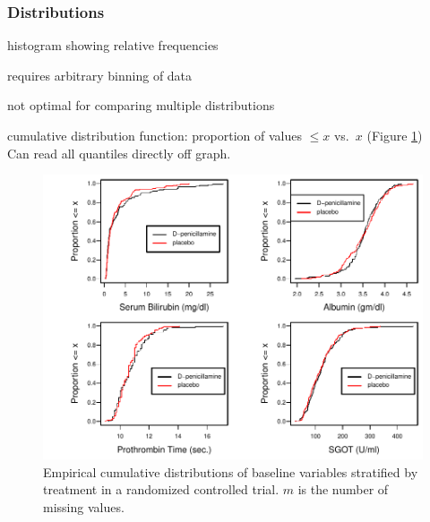 \subsubsection{Distributions}
\bi
\item histogram showing relative frequencies
 \bi
 \item requires arbitrary binning of data
 \item not optimal for comparing multiple distributions
 \ei
\item cumulative distribution function: proportion of values $\leq x$
  vs.\ $x$ (Figure \ref{fig:descript-ecdf}) \\
 Can read all quantiles directly off graph.
\begin{Schunk}
\begin{figure}[htbp]

\centerline{\includegraphics{descript-ecdf-1} }

\caption[Empirical cumulative distribution functions]{Empirical cumulative distributions of baseline variables  stratified by treatment in a randomized controlled trial. $m$ is the number of missing values.}\label{fig:descript-ecdf}
\end{figure}
\end{Schunk}

